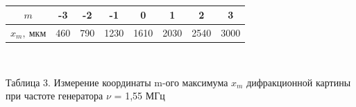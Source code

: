 \

\newline

\begin{center}
\begin{tabular}{|c|c|c|c|c|c|c|c|}
\hline
$m$ &-3&-2&-1&0&1&2&3\\
\hline
$x_m, \ мкм$ &460&790& 1230&1610&2030&2540&3000\\
\hline
\end{tabular}

\

\newline

Таблица 3. Измерение координаты m-ого максимума $x_m$ дифракционной картины при частоте генератора $\nu$ = 1,55 МГц
\end{center}

\

\newline

